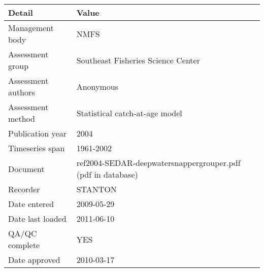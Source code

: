 \begin{table}[htb]
\centering
\begin{tabular}{lp{7cm}}
\toprule
Detail & Value \\
\midrule
Management body    & NMFS                                                        \\
Assessment group   & Southeast Fisheries Science Center                          \\
Assessment authors & Anonymous                                                   \\
Assessment method  & Statistical catch-at-age model                              \\
Publication year   & 2004                                                        \\
Timeseries span    & 1961-2002                                                   \\
Document           & ref2004-SEDAR-deepwatersnappergrouper.pdf (pdf in database) \\
Recorder           & STANTON                                                     \\
Date entered       & 2009-05-29                                                  \\
Date last loaded   & 2011-06-10                                                  \\
QA/QC complete     & YES                                                         \\
Date approved      & 2010-03-17                                                  \\
\bottomrule
\end{tabular}
\label{tab:assessdet}
\end{table}
